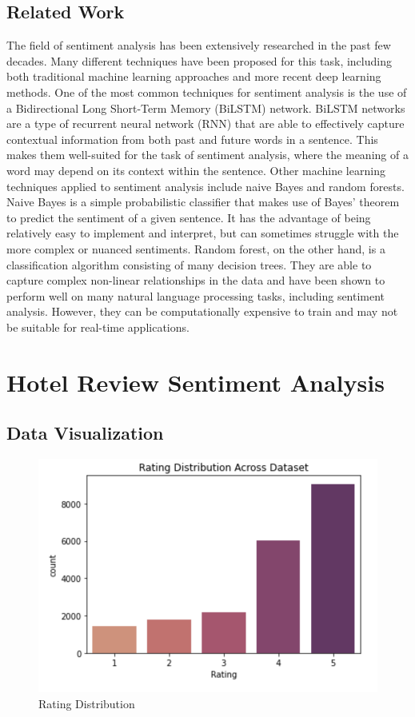\documentclass{article}
\begin{document}
\subsection{Related Work}
The field of sentiment analysis has been extensively researched in the past few decades. Many different techniques have been proposed for this task, including both traditional machine learning approaches and more recent deep learning methods. One of the most common techniques for sentiment analysis is the use of a Bidirectional Long Short-Term Memory (BiLSTM) network. BiLSTM networks are a type of recurrent neural network (RNN) that are able to effectively capture contextual information from both past and future words in a sentence. This makes them well-suited for the task of sentiment analysis, where the meaning of a word may depend on its context within the sentence.
Other machine learning techniques applied to sentiment analysis include naive Bayes and random forests. Naive Bayes is a simple probabilistic classifier that makes use of Bayes' theorem to predict the sentiment of a given sentence. It has the advantage of being relatively easy to implement and interpret, but can sometimes struggle with the more complex or nuanced sentiments. Random forest, on the other hand, is a classification algorithm consisting of many decision trees. They are able to capture complex non-linear relationships in the data and have been shown to perform well on many natural language processing tasks, including sentiment analysis. However, they can be computationally expensive to train and may not be suitable for real-time applications.

\section{Hotel Review Sentiment Analysis}

\subsection{Data Visualization}

\begin{figure}[h]
\centering
\includegraphics[width=0.6\linewidth]{distribution.png} 
\caption{Rating Distribution}
\label{fig:wrapfig}
\end{figure}
\end{document}

